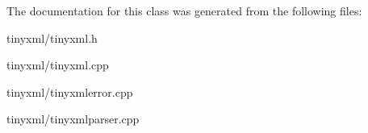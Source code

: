 \-The documentation for this class was generated from the following files\-:\begin{DoxyCompactItemize}
\item 
tinyxml/tinyxml.\-h\item 
tinyxml/tinyxml.\-cpp\item 
tinyxml/tinyxmlerror.\-cpp\item 
tinyxml/tinyxmlparser.\-cpp\end{DoxyCompactItemize}
